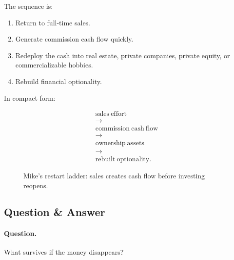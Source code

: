\documentclass[11pt,oneside]{book}
\begin{document}
The sequence is:

\begin{enumerate}
\item Return to full-time sales.
\item Generate commission cash flow quickly.
\item Redeploy the cash into real estate, private companies, private equity, or commercializable hobbies.
\item Rebuild financial optionality.
\end{enumerate}

In compact form:

\begin{equation}
\begin{gathered}
\mathrm{sales\ effort}\\
\longrightarrow\\
\mathrm{commission\ cash\ flow}\\
\longrightarrow\\
\mathrm{ownership\ assets}\\
\longrightarrow\\
\mathrm{rebuilt\ optionality}.
\end{gathered}
\end{equation}

\begin{figure}
\centering
{}
\caption{Mike's restart ladder: sales creates cash flow before investing reopens.}
\end{figure}

\subsection{Question \& Answer}

\paragraph{Question.}
What survives if the money disappears?
\end{document}
